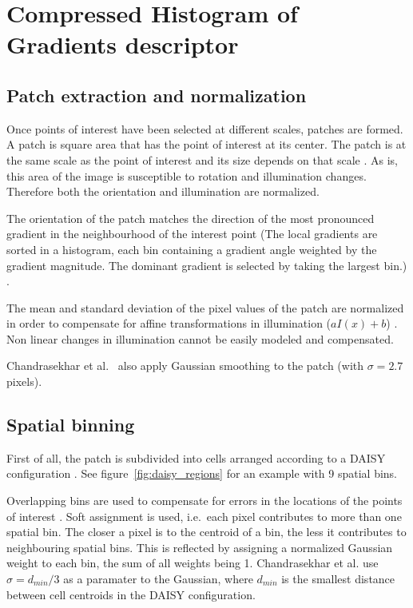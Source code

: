 \section{Compressed Histogram of Gradients descriptor}

\subsection{Patch extraction and normalization}

Once points of interest have been selected at different scales, patches are formed. A patch is square area that has the point of interest at its center. The patch is at the same scale as the point of interest and its size depends on that scale \cite{Mikolajczyk2005PEL}. As is, this area of the image is susceptible to rotation and illumination changes. Therefore both the orientation and illumination are normalized.

The orientation of the patch matches the direction of the most pronounced gradient in the neighbourhood of the interest point (The local gradients are sorted in a histogram, each bin containing a gradient angle weighted by the gradient magnitude. The dominant gradient is selected by taking the largest bin.) \cite{Lowe04distinctiveimage}.

The mean and standard deviation of the pixel values of the patch are normalized in order to compensate for affine transformations in illumination ($aI(x) + b$) \cite{Mikolajczyk2005PEL}. Non linear changes in illumination cannot be easily modeled and compensated.

Chandrasekhar et al.\ \cite{chog2011} also apply Gaussian smoothing to the patch (with $\sigma = 2.7$ pixels).

\subsection{Spatial binning}

First of all, the patch is subdivided into cells arranged according to a DAISY configuration \cite{Tola08,best_daisy}. See figure~\ref{fig:daisy_regions} for an example with 9 spatial bins.

Overlapping bins are used to compensate for errors in the locations of the points of interest \cite{chog2011}. Soft assignment is used, i.e.\ each pixel contributes to more than one spatial bin. The closer a pixel is to the centroid of a bin, the less it contributes to neighbouring spatial bins. This is reflected by assigning a normalized Gaussian weight to each bin, the sum of all weights being 1. Chandrasekhar et al.\cite{chog2011} use $\sigma=d_{min}/3$ as a paramater to the Gaussian, where $d_{min}$ is the smallest distance between cell centroids in the DAISY configuration.

